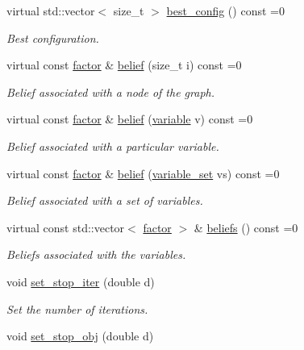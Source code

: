 \begin{DoxyCompactItemize}
virtual std\+::vector$<$ size\+\_\+t $>$ \hyperlink{classmerlin_1_1algorithm_a3d84d2595e6235db93a9bb3e1a012e48}{best\+\_\+config} () const =0
\begin{DoxyCompactList}\small\item\em Best configuration. \end{DoxyCompactList}\item 
virtual const \hyperlink{classmerlin_1_1factor}{factor} \& \hyperlink{classmerlin_1_1algorithm_a617b3e562037a7716f7cfd6cf1e55c19}{belief} (size\+\_\+t i) const =0
\begin{DoxyCompactList}\small\item\em Belief associated with a node of the graph. \end{DoxyCompactList}\item 
virtual const \hyperlink{classmerlin_1_1factor}{factor} \& \hyperlink{classmerlin_1_1algorithm_adc966d1ed7ac479754441bab138f7efa}{belief} (\hyperlink{classmerlin_1_1variable}{variable} v) const =0
\begin{DoxyCompactList}\small\item\em Belief associated with a particular variable. \end{DoxyCompactList}\item 
virtual const \hyperlink{classmerlin_1_1factor}{factor} \& \hyperlink{classmerlin_1_1algorithm_ad19b068623b85ad1cd4bb262e7bcfc6f}{belief} (\hyperlink{classmerlin_1_1variable__set}{variable\+\_\+set} vs) const =0
\begin{DoxyCompactList}\small\item\em Belief associated with a set of variables. \end{DoxyCompactList}\item 
virtual const std\+::vector$<$ \hyperlink{classmerlin_1_1factor}{factor} $>$ \& \hyperlink{classmerlin_1_1algorithm_a0b70d8fe87b32bca601a3d116b673b47}{beliefs} () const =0
\begin{DoxyCompactList}\small\item\em Beliefs associated with the variables. \end{DoxyCompactList}\item 
void \hyperlink{classmerlin_1_1algorithm_a5966656c44e83ffd5c77f40b507fcfc2}{set\+\_\+stop\+\_\+iter} (double d)
\begin{DoxyCompactList}\small\item\em Set the number of iterations. \end{DoxyCompactList}\item 
void \hyperlink{classmerlin_1_1algorithm_a14631bff623456c8f9e50cd54ea12bc0}{set\+\_\+stop\+\_\+obj} (double d)

\end{DoxyCompactItemize}
